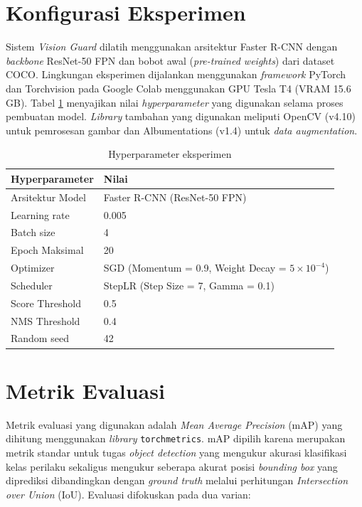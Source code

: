 \documentclass[11pt,a4paper,oneside]{report}
\begin{document}
\section{Konfigurasi Eksperimen}

Sistem \textit{Vision Guard} dilatih menggunakan arsitektur Faster R-CNN dengan \textit{backbone} ResNet-50 FPN dan bobot awal (\textit{pre-trained weights}) dari dataset COCO. Lingkungan eksperimen dijalankan menggunakan \textit{framework} PyTorch dan Torchvision pada Google Colab menggunakan GPU Tesla T4 (VRAM 15.6 GB). Tabel \ref{tab:hyperparam} menyajikan nilai \textit{hyperparameter} yang digunakan selama proses pembuatan model. \textit{Library} tambahan yang digunakan meliputi OpenCV (v4.10) untuk pemrosesan gambar dan Albumentations (v1.4) untuk \textit{data augmentation}.

\begin{table}[h!]
\centering
\caption{Hyperparameter eksperimen}
\label{tab:hyperparam}
\begin{tabular}{ll}
\toprule
\textbf{Hyperparameter} & \textbf{Nilai} \\
\midrule
Arsitektur Model & Faster R-CNN (ResNet-50 FPN) \\
Learning rate    & 0.005 \\
Batch size       & 4 \\
Epoch Maksimal   & 20 \\
Optimizer        & SGD (Momentum = 0.9, Weight Decay = $5\times10^{-4}$) \\
Scheduler        & StepLR (Step Size = 7, Gamma = 0.1) \\
Score Threshold  & 0.5 \\
NMS Threshold    & 0.4 \\
Random seed      & 42 \\
\bottomrule
\end{tabular}
\end{table}

\section{Metrik Evaluasi}

Metrik evaluasi yang digunakan adalah \textit{Mean Average Precision} (mAP) yang dihitung menggunakan \textit{library} \texttt{torchmetrics}. mAP dipilih karena merupakan metrik standar untuk tugas \textit{object detection} yang mengukur akurasi klasifikasi kelas perilaku sekaligus mengukur seberapa akurat posisi \textit{bounding box} yang diprediksi dibandingkan dengan \textit{ground truth} melalui perhitungan \textit{Intersection over Union} (IoU). Evaluasi difokuskan pada dua varian:
\end{document}
